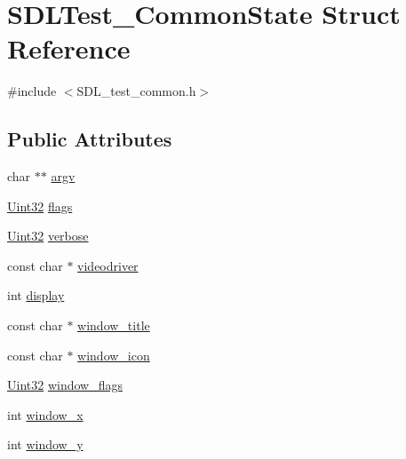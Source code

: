 \hypertarget{struct_s_d_l_test___common_state}{}\section{S\+D\+L\+Test\+\_\+\+Common\+State Struct Reference}
\label{struct_s_d_l_test___common_state}


{\ttfamily \#include $<$S\+D\+L\+\_\+test\+\_\+common.\+h$>$}

\subsection*{Public Attributes}
\begin{DoxyCompactItemize}
\item 
char $\ast$$\ast$ \mbox{\hyperlink{struct_s_d_l_test___common_state_a6db840410b86ab7c6807763fd8bcb081}{argv}}
\item 
\mbox{\hyperlink{_s_d_l__stdinc_8h_add440eff171ea5f55cb00c4a9ab8672d}{Uint32}} \mbox{\hyperlink{struct_s_d_l_test___common_state_a97272d03558f1f74e579ec8a5cdabc5e}{flags}}
\item 
\mbox{\hyperlink{_s_d_l__stdinc_8h_add440eff171ea5f55cb00c4a9ab8672d}{Uint32}} \mbox{\hyperlink{struct_s_d_l_test___common_state_aad4b8ebf6277cd9d3608d2e1b48e4678}{verbose}}
\item 
const char $\ast$ \mbox{\hyperlink{struct_s_d_l_test___common_state_ab3face917946465c60dc0f38f179534d}{videodriver}}
\item 
int \mbox{\hyperlink{struct_s_d_l_test___common_state_addb3de8e2b278deed8d2309bafd30758}{display}}
\item 
const char $\ast$ \mbox{\hyperlink{struct_s_d_l_test___common_state_a86640ebac0afe0c504c3c324d84dcc37}{window\+\_\+title}}
\item 
const char $\ast$ \mbox{\hyperlink{struct_s_d_l_test___common_state_ac9e981b2b60a59f995153c74242d9d43}{window\+\_\+icon}}
\item 
\mbox{\hyperlink{_s_d_l__stdinc_8h_add440eff171ea5f55cb00c4a9ab8672d}{Uint32}} \mbox{\hyperlink{struct_s_d_l_test___common_state_a9e38339b34b483087ff8d52d44a80809}{window\+\_\+flags}}
\item 
int \mbox{\hyperlink{struct_s_d_l_test___common_state_a5413ab562164642b3e6ee97ab5d938bf}{window\+\_\+x}}
\item 
int \mbox{\hyperlink{struct_s_d_l_test___common_state_a1fcd61cbe37c2bb563e7b2f1c6853d29}{window\+\_\+y}}
\item 
$$
\end{DoxyCompactItemize}
